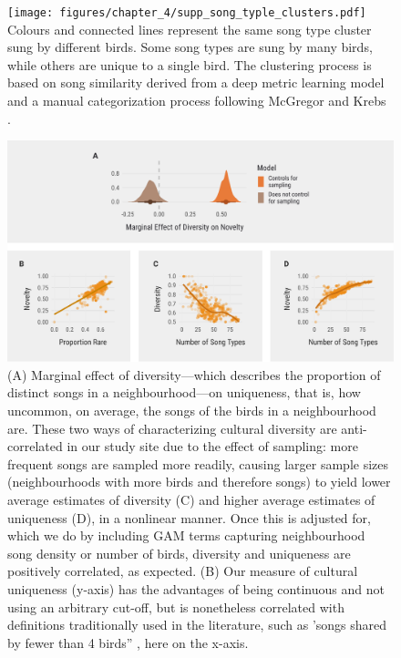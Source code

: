 \documentclass[9pt, onecolumn, twoside, lineno]{gsajnl}
\begin{document}
\begin{figure}[tbp]
    \centering
    \texttt{[image: figures/chapter\_4/supp\_song\_typle\_clusters.pdf]}
    {
Colours and connected lines represent the same song type cluster sung by different birds. Some song types are sung by many birds, while others are unique to a single bird. The clustering process is based on song similarity derived from a deep metric learning model and a manual categorization process following McGregor and Krebs \autocite{mcgregor1982b}.
    }
    \label{fig:supp_song_typle_clusters}
\end{figure}


\begin{figure}[tbp]
    \centering
    \includegraphics[width=\linewidth]{figures/chapter_4/supp_song_sampling.pdf}
    {
        (A) Marginal effect of diversity---which describes the proportion of distinct songs in a neighbourhood---on uniqueness, that is, how uncommon, on average, the songs of the birds in a neighbourhood are. These two ways of characterizing cultural diversity are anti-correlated in our study site due to the effect of sampling: more frequent songs are sampled more readily, causing larger sample sizes (neighbourhoods with more birds and therefore songs) to yield lower average estimates of diversity (C) and higher average estimates of uniqueness (D), in a nonlinear manner. Once this is adjusted for, which we do by including GAM terms capturing neighbourhood song density or number of birds, diversity and uniqueness are positively correlated, as expected. (B) Our measure of cultural uniqueness (y-axis) has the advantages of being continuous and not using an arbitrary cut-off, but is nonetheless correlated with definitions traditionally used in the literature, such as 'songs shared by fewer than 4 birds” \autocite{mcgregor1982b}, here on the x-axis.}
    \label{fig:supp_song_sampling}
\end{figure}
\end{document}
